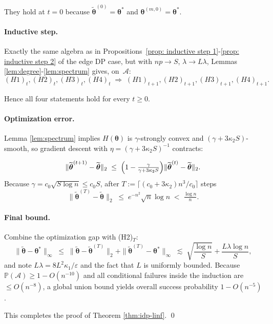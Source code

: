 \documentclass[letterpaper,12pt]{article}
\numberwithin{equation}{section}
\theoremstyle{plain}
\numberwithin{Theorem}{section}
\numberwithin{corollary}{section}
\numberwithin{proposition}{section}
\numberwithin{Lemma}{section}
{
	\theoremstyle{definition}
	\newtheorem{Definition}{Definition}
	\newtheorem{example}{Example}
	\numberwithin{example}{section}
	\newtheorem{fact}{Fact}
	\numberwithin{fact}{section}
	\newtheorem{remark}{Remark}
}
\newcommand{\Pro}{\mathbb{P}}
\newcommand{\1}{\mathbbm{1}}
\def\bth{{\boldsymbol{\theta}}}
\begin{document}
They hold at $t=0$ because $\widetilde\bth^{(0)}=\bth^{*}$ and
$\bth^{(m,0)}=\bth^{*}$.

\paragraph{Inductive step.}
Exactly the same algebra as in Propositions~\ref{prop: inductive step 1}-\ref{prop: inductive step 2} of the edge DP case, but with \(np\to S\), \(\lambda\to L\lambda\),
 Lemmas \ref{lem:degree}-\ref{lem:spectrum}
gives, on~\(\mathcal A\):
\[
(H1)_t,(H2)_t,(H3)_t,(H4)_t
\;\Longrightarrow\;
(H1)_{t+1},(H2)_{t+1},(H3)_{t+1},(H4)_{t+1}.
\]

Hence all four statements hold for every $t\ge0$.

\paragraph{Optimization error.}
Lemma \ref{lem:spectrum} implies
\(H(\bth)\) is $\gamma$-strongly convex and
$(\gamma+3\kappa_{2}S)$-smooth, so gradient descent with
\(\eta=(\gamma+3\kappa_{2}S)^{-1}\) contracts:

\[
\|\widetilde\bth^{(t+1)}-\widetilde\bth\|_{2}
\;\le\;
\Bigl(1-\tfrac{\gamma}{\gamma+3\kappa_{2}S}\Bigr)
\|\widetilde\bth^{(t)}-\widetilde\bth\|_{2}.
\]
Because \(\gamma=c_{0}\sqrt{S\log n}\le c_{0}S\),
after \(T:=\lceil (c_{0}+3\kappa_{2})n^{3}/c_{0}\rceil\) steps
\[
\|\widetilde\bth^{(T)}-\widetilde\bth\|_{2}
\;\le\;
e^{-n^{2}}\sqrt n\log n
\;<\;\tfrac{\log n}{n}.
\]

\paragraph{Final bound.}
Combine the optimization gap with (H2)\(_T\):
\[
\|\widetilde\bth-\bth^{*}\|_{\infty}
\;\le\;
\|\widetilde\bth-\widetilde\bth^{(T)}\|_{2}
+\|\widetilde\bth^{(T)}-\bth^{*}\|_{\infty}
\;\lesssim\;
\sqrt{\frac{\log n}{S}}
+\frac{L\lambda\log n}{S},
\]
and note \(L\lambda=8L^{2}\kappa_{1}/\varepsilon\) and the  fact that $L$ is uniformly bounded.
Because $\Pro(\mathcal A)\ge1-O(n^{-10})$ and all conditional failures
inside the induction are $\le O(n^{-8})$, a global union bound yields
overall success probability \(1-O(n^{-5})\).

This completes the proof of Theorem \ref{thm:idp-linf}. \qed


\end{document}
